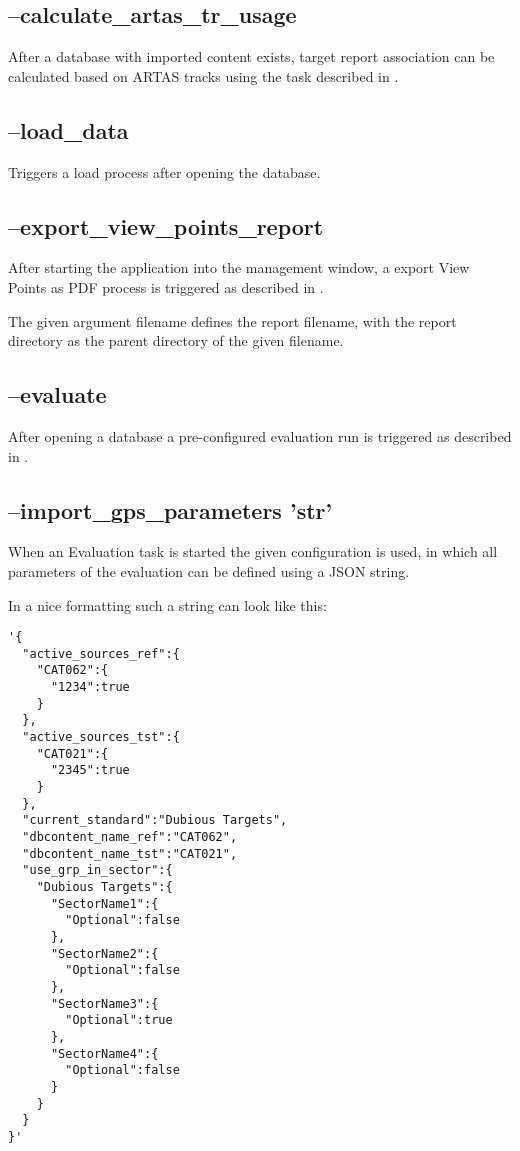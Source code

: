 \subsection{--calculate\_artas\_tr\_usage}

After a database with imported content exists, target report association can be calculated based on ARTAS tracks using the task described in .

\subsection{--load\_data}

Triggers a load process after opening the database.

\subsection{--export\_view\_points\_report}

After starting the application into the management window, a export View Points as PDF process is triggered as described in
.

The given argument filename defines the report filename, with the report directory as the parent directory of the given filename.

\subsection{--evaluate}

After opening a database a pre-configured evaluation run is triggered as described in .

\subsection{--import\_gps\_parameters 'str'}

When an Evaluation task is started the given configuration is used, in which all parameters of the evaluation can be defined using a JSON string.

In a nice formatting such a string can look like this:
\begin{lstlisting}[basicstyle=\small\ttfamily]
'{
  "active_sources_ref":{
    "CAT062":{
      "1234":true
    }
  },
  "active_sources_tst":{
    "CAT021":{
      "2345":true
    }
  },
  "current_standard":"Dubious Targets",
  "dbcontent_name_ref":"CAT062",
  "dbcontent_name_tst":"CAT021",
  "use_grp_in_sector":{
    "Dubious Targets":{
      "SectorName1":{
        "Optional":false
      },
      "SectorName2":{
        "Optional":false
      },
      "SectorName3":{
        "Optional":true
      },
      "SectorName4":{
        "Optional":false
      }
    }
  }
}'
\end{lstlisting}
\ \\

